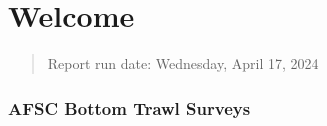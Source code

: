 \documentclass[
  letterpaper,
  oneside,
  open=any]{scrbook}
\renewcommand*\contentsname{Table of contents}
\newcommand\contentsname{Table of contents}
\begin{document}
\begin{frontmatter}
\begin{titlepage}
\begin{minipage}[b][\textheight][s]{\minipagewidth}
\titleblock

\authorblock

\affiliationblock

\vfill

\logoblock

\footerblock
\par

\end{minipage}
\clearpage
\restoregeometry
\end{titlepage}
\setcounter{page}{1}
\end{frontmatter}


\renewcommand*\contentsname{Table of contents}
{
\setcounter{tocdepth}{1}
\tableofcontents
}
\listoffigures
\listoftables
\mainmatter
\part{Welcome}

\begin{quote}
Report run date: Wednesday, April 17, 2024
\end{quote}

\hypertarget{afsc-bottom-trawl-surveys}{%
\section*{AFSC Bottom Trawl Surveys}\label{afsc-bottom-trawl-surveys}}

\end{document}
